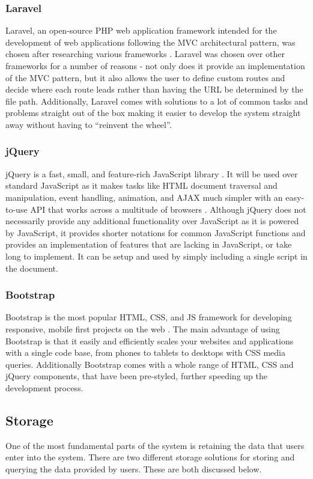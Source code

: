 \subsubsection{Laravel}
Laravel, an open-source PHP web application framework intended for the development of web applications following the MVC architectural pattern, was chosen after researching various frameworks \cite{Laravel:Home}. Laravel was chosen over other frameworks for a number of reasons - not only does it provide an implementation of the MVC pattern, but it also allows the user to define custom routes and decide where each route leads rather than having the URL be determined by the file path. Additionally, Laravel comes with solutions to a lot of common tasks and problems straight out of the box making it easier to develop the system straight away without having to ``reinvent the wheel''.

\subsubsection{jQuery} 
jQuery is a fast, small, and feature-rich JavaScript library \cite{jQuery:Home}. It will be used over standard JavaScript as it makes tasks like HTML document traversal and manipulation, event handling, animation, and AJAX much simpler with an easy-to-use API that works across a multitude of browsers \cite{jQuery:Home}. Although jQuery does not necessarily provide any additional functionality over JavaScript as it is powered by JavaScript, it provides shorter notations for common JavaScript functions and provides an implementation of features that are lacking in JavaScript, or take long to implement. It can be setup and used by simply including a single script in the document.

\subsubsection{Bootstrap} 
Bootstrap is the most popular HTML, CSS, and JS framework for developing responsive, mobile first projects on the web \cite{Bootstrap:Home}. The main advantage of using Bootstrap is that it easily and efficiently scales your websites and applications with a single code base, from phones to tablets to desktops with CSS media queries. Additionally Bootstrap comes with a whole range of HTML, CSS and jQuery components, that have been pre-styled, further speeding up the development process.

\subsection{Storage}
One of the most fundamental parts of the system is retaining the data that users enter into the system. There are two different storage solutions for storing and querying the data provided by users. These are both discussed below.


